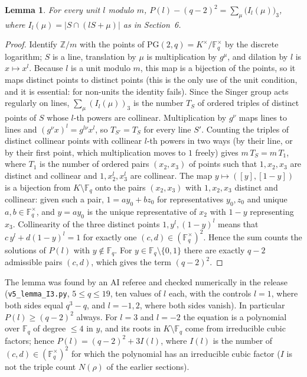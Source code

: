 \documentclass[11pt]{article}
\newtheorem{lemma}{Lemma}
\begin{document}
\begin{lemma}\label{lem:I3}
For every unit $l$ modulo $m$, $P(l)-(q-2)^2=\sum_{\mu}\bigl(I_l(\mu)\bigr)_3$, where $I_l(\mu)=|S\cap(lS+\mu)|$ as in Section~6.
\end{lemma}
\begin{proof}
Identify $\mathbb Z/m$ with the points of $\mathrm{PG}(2,q)=K^\times/\mathbb F_q^\times$ by the discrete logarithm; $S$ is a line, translation by $\mu$ is multiplication by $g^\mu$, and
dilation by $l$ is $x\mapsto x^l$. Because $l$ is a unit modulo $m$, this map is a bijection of the points, so it maps distinct points to distinct points (this is the only use of the
unit condition, and it is essential: for non-units the identity fails). Since the Singer group acts regularly on lines, $\sum_\mu(I_l(\mu))_3$ is the number $T_S$ of ordered
triples of distinct points of $S$ whose $l$-th powers are collinear. Multiplication by $g^\nu$ maps lines to lines and $(g^\nu x)^l=g^{l\nu}x^l$, so $T_{S'}=T_S$ for every line $S'$.
Counting the triples of distinct collinear points with collinear $l$-th powers in two ways (by their line, or by their first point, which multiplication moves to $1$ freely) gives
$m\,T_S=m\,T_1$, where $T_1$ is the number of ordered pairs $(x_2,x_3)$ of points such that $1,x_2,x_3$ are distinct and collinear and $1,x_2^l,x_3^l$ are collinear.
The map $y\mapsto([y],[1-y])$ is a bijection from $K\setminus\mathbb F_q$ onto the pairs $(x_2,x_3)$ with $1,x_2,x_3$ distinct and collinear: given such a pair, $1=a y_0+b z_0$ for
representatives $y_0,z_0$ and unique $a,b\in\mathbb F_q^\times$, and $y=a y_0$ is the unique representative of $x_2$ with $1-y$ representing $x_3$. Collinearity of the three distinct points
$1,y^l,(1-y)^l$ means that $c\,y^l+d(1-y)^l=1$ for exactly one $(c,d)\in(\mathbb F_q^\times)^2$. Hence the sum counts the solutions of $P(l)$ with $y\notin\mathbb F_q$. For
$y\in\mathbb F_q\setminus\{0,1\}$ there are exactly $q-2$ admissible pairs $(c,d)$, which gives the term $(q-2)^2$.
\end{proof}
The lemma was found by an AI referee and checked numerically in the release (\texttt{v5\_lemma\_I3.py}, $5\le q\le19$, ten values of $l$ each, with the controls $l=1$, where both sides
equal $q^3-q$, and $l=-1,2$, where both sides vanish). In particular $P(l)\ge(q-2)^2$ always. For $l=3$ and $l=-2$
the equation is a polynomial over $\mathbb F_q$ of degree $\le4$ in $y$, and its roots in $K\setminus\mathbb F_q$ come from irreducible cubic factors; hence
$P(l)=(q-2)^2+3I(l)$, where $I(l)$ is the number of $(c,d)\in(\mathbb F_q^\times)^2$ for which the polynomial has an irreducible cubic factor
($I$ is not the triple count $N(\rho)$ of the earlier sections).
\end{document}
